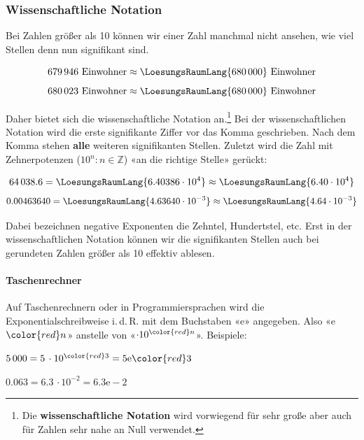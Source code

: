 
  
\subsubsection{Wissenschaftliche Notation}\label{wissenschaftlicheNotation}
Bei Zahlen größer als 10 können wir einer Zahl manchmal nicht ansehen, wie viel Stellen denn nun signifikant sind.

$$ 679\,946 \textrm{\ Einwohner} \approx  \LoesungsRaumLang{680\,000} \textrm{\ Einwohner}$$
$$ 680\,023 \textrm{\ Einwohner} \approx  \LoesungsRaumLang{680\,000} \textrm{\ Einwohner}$$

Daher bietet sich die wissenschaftliche Notation an.\footnote{Die
\textbf{wissenschaftliche Notation} wird vorwiegend für sehr große
aber auch für Zahlen sehr nahe an Null verwendet.}
Bei der wissenschaftlichen Notation wird die erste signifikante Ziffer
vor das Komma geschrieben. Nach dem Komma stehen \textbf{alle} weiteren signifikanten Stellen.
Zuletzt wird die Zahl mit Zehnerpotenzen
($10^{n}: n \in \mathbb{Z}$) «an die richtige Stelle» gerückt:

$$64\,038.6  = \LoesungsRaumLang{6.40386 \cdot 10^{ 4}} \approx \LoesungsRaumLang{6.40 \cdot 10^{ 4}}$$
$$0.00463640 = \LoesungsRaumLang{4.63640 \cdot 10^{-3}} \approx \LoesungsRaumLang{4.64 \cdot 10^{-3}}$$

Dabei bezeichnen negative Exponenten die Zehntel, Hundertstel, etc.
Erst in der wissenschaftlichen Notation können wir die signifikanten Stellen auch bei gerundeten Zahlen größer als 10 effektiv ablesen.

\newpage

\paragraph{Taschenrechner} Auf Taschenrechnern oder in
Programmiersprachen wird die Exponentialschreibweise i.\,d.\,R. mit dem
Buchstaben «e» angegeben. Also «e$\color{red}n$» anstelle von «$\cdot10^{\color{red}n}$». Beispiele:

$5\,000 = 5\, \cdot 10^{\color{red}3} = 5\mathrm{e}\color{red}3$

$0.063 = 6.3\, \cdot 10^{-2} = 6.3\mathrm{e-}2$

